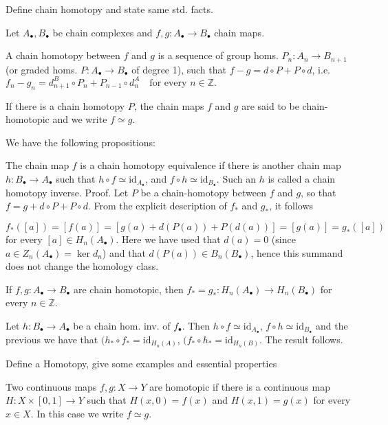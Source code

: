 Define chain homotopy and state same std. facts.

Let \( A_\bullet, B_\bullet \) be chain complexes and \( f,g : A_\bullet \to B_\bullet \) chain maps.

A chain homotopy between \( f \) and \( g \) is a sequence of group homs. \( P_n : A_n \to B_{n+1} \)
(or graded homs. \( P : A_\bullet \to B_\bullet \) of degree 1),
such that \(f - g = d \circ P + P \circ d\), i.e. 
\(f_n - g_n = d^B_{n+1} \circ P_n + P_{n-1} \circ d^A_n \quad \text{for every } n \in \mathbb{Z}.\)

If there is a chain homotopy \(P\), the chain maps \(f\) and \(g\) are said to be chain-homotopic and we write \(f \simeq g\).

We have the following propositions:

The chain map \(f\) is a chain homotopy equivalence if there is another chain map \(h: B_\bullet \to A_\bullet\) such that \(h \circ f \simeq \text{id}_{A_\bullet}\), 
and \(f \circ h \simeq \text{id}_{B_\bullet}\). Such an \(h\) is called a chain homotopy inverse.
Proof. 
Let \(P\) be a chain-homotopy between \(f\) and \(g\), so that \(f = g + d \circ P + P \circ d\). From the explicit description of \(f_*\) and \(g_*\), it follows

\(f_*([a]) = [f(a)] = [g(a) + d(P(a)) + P(d(a))] = [g(a)] = g_*([a])\)
for every \([a] \in H_n(A_\bullet)\). Here we have used that \(d(a) = 0\) (since \(a \in Z_n(A_\bullet) = \ker d_n\)) and that \(d(P(a)) \in B_n(B_\bullet)\), hence this summand does not change the homology class.

If \( f, g : A_\bullet \to B_\bullet \) are chain homotopic, then \( f_{\ast} = g_{\ast} : H_n(A_\bullet) \to H_n(B_{\bullet})\)
for every \( n \in \mathbb{Z} \).

Let \( h : B_\bullet \to A_\bullet \) be a chain hom. inv. of \( f_{\bullet} \). Then \( h \circ f \simeq \text{id}_{A_{\bullet}} \), \( f \circ h \simeq \text{id}_{B_{\bullet}} \) and the previous we have that \( (h_\ast \circ f_{\ast} = \text{id}_{H_n(A)} \), \( (f_\ast \circ h_{\ast} = \text{id}_{H_n(B)} \). The result follows.


Define a Homotopy, give some examples and essential properties

Two continuous maps \( f, g : X \to Y \) are homotopic if there is a continuous map
\( H : X \times [0, 1] \to Y \) such that \( H(x, 0) = f(x) \) and \(H(x, 1) = g(x)\) for every \( x \in X \). 
In this case we write \( f \simeq g \).

